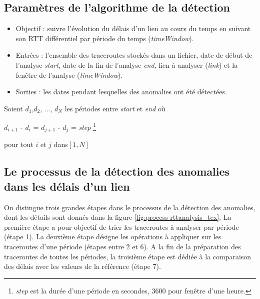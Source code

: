 \begin{figure}[H]
	\centering
	\resizebox{\textwidth}{!}{
	
}
	\caption{}
	\label{fig:traceroute}
\end{figure}

\subsection{Paramètres de l'algorithme de la détection}

\begin{itemize}
		\item  Objectif : suivre l'évolution du délais d'un lien au cours du temps en suivant son RTT différentiel par période du temps (\textit{timeWindow}).
	\item Entrées : l'ensemble des traceroutes stockés dans un fichier, date de début de l'analyse \textit{start}, date de la fin de l'analyse \textit{end}, lien à analyser (\textit{link}) et la fenêtre de l'analyse (\textit{timeWindow}).
	\item Sorties : les dates pendant lesquelles des anomalies ont été détectées.
\end{itemize}

Soient $ d_1 $,$  d_2 $, ..., $ d_N $ les périodes entre \textit{start} et \textit{end} où

\begin{center}
	 $  d_{i+1} $ - $  d_{i} $ = $  d_{j+1} $ - $  d_{j} $ = \textit{step} \footnote{\textit{step} est la durée d'une période en secondes, $3600$ pour fenêtre d'une heure.}
\end{center}
 
 pour tout $ i $ et $ j $ dans$  [1,N] $
\subsection{Le processus de la détection des anomalies dans les délais d'un lien}\label{steps-rtt-analysis}

On distingue trois grandes étapes dans le processus de la détection des anomalies, dont les détails sont donnés dans la figure \ref{fig:process-rttanalysis_tex}. La première étape a pour objectif de trier les traceroutes à analyser par période (étape 1). La deuxième étape désigne les opérations à appliquer sur les traceroutes d'une période (étapes entre 2 et 6). A la fin de la préparation des traceroutes de toutes les périodes, la troisième étape est dédiée à la comparaison des délais avec les valeurs de la référence (étape 7).
